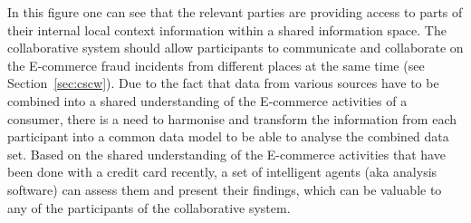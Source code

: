 In this figure one can see that the relevant parties are providing access to parts of their internal local context information within a shared information space. The collaborative system should allow participants to communicate and collaborate on the \gls{E-commerce} fraud incidents from different places at the same time (see Section~\ref{sec:cscw}). Due to the fact that data from various sources have to be combined into a shared understanding of the \gls{E-commerce} activities of a consumer, there is a need to harmonise and transform the information from each participant into a common data model to be able to analyse the combined data set. Based on the shared understanding of the \gls{E-commerce} activities that have been done with a credit card recently, a set of intelligent agents (aka analysis software) can assess them and present their findings, which can be valuable to any of the participants of the collaborative system.

